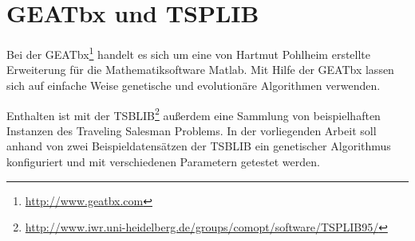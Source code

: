 \section{GEATbx und TSPLIB}
Bei der GEATbx\footnote{\url{http://www.geatbx.com}} handelt es sich um eine 
von Hartmut Pohlheim erstellte Erweiterung für die Mathematiksoftware Matlab. 
Mit Hilfe der GEATbx lassen sich auf einfache Weise genetische und evolutionäre 
Algorithmen verwenden.

Enthalten ist mit der 
TSBLIB\footnote{\url{http://www.iwr.uni-heidelberg.de/groups/comopt/software/TSPLIB95/}} 
außerdem eine Sammlung von beispielhaften Instanzen des Traveling Salesman 
Problems. In der vorliegenden Arbeit soll anhand von zwei Beispieldatensätzen 
der TSBLIB ein genetischer Algorithmus konfiguriert und mit verschiedenen 
Parametern getestet werden.